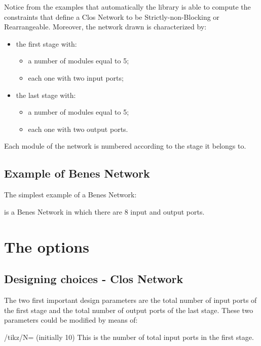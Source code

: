 \documentclass{ltxdoc} %
\begin{document}
Notice from the examples that automatically the library is able to compute the constraints that define a Clos Network to be Strictly-non-Blocking or Rearrangeable. Moreover, the network drawn is characterized by:
\begin{itemize}
\item the first stage with:
\begin{itemize}
\item a number of modules equal to 5;
\item each one with two input ports;
\end{itemize}
\item the last stage with:
\begin{itemize}
\item a number of modules equal to 5;
\item each one with two output ports.
\end{itemize}
\end{itemize}
Each module of the network is numbered according to the stage it belongs to.

\subsection{Example of Benes Network}

The simplest example of a Benes Network:
\begin{codeexample}[]
\begin{tikzpicture}
    \node[benes] {};
\end{tikzpicture}
\end{codeexample}
is a Benes Network in which there are 8 input and output ports. 

\begin{codeexample}[]
\end{codeexample}

\section{The options}
\subsection{Designing choices - Clos Network}
The two first important design parameters are the total number of input ports of the first stage and the total number of output ports of the last stage. These two parameters could be modified by means of:
\begin{key}{/tikz/N= (initially 10)}
    This is the number of total input ports in the first stage.
\end{key}
\end{document}
